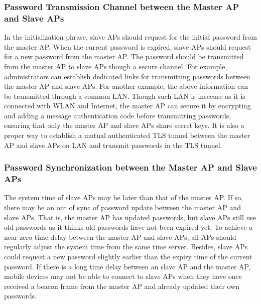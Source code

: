 \subsubsection{Password Transmission Channel between the Master AP and Slave APs} 
In the initialization phrase, slave APs should request for the initial password from the master AP. When the current password is expired, slave APs should request for a new password from the master AP. The password should be transmitted from the master AP to slave APs though a secure channel. For example, administrators can establish dedicated links for transmitting passwords between the master AP and slave APs. For another example, the above information can be transmitted through a common LAN. Though such LAN is insecure as it is connected with WLAN and Internet, the master AP can secure it by encrypting and adding a message authentication code before transmitting passwords, ensuring that only the master AP and slave APs share secret keys. It is also a proper way to establish a mutual authenticated TLS tunnel between the master AP and slave APs on LAN and transmit passwords in the TLS tunnel. 


\subsubsection{Password Synchronization between the Master AP and Slave APs}
The system time of slave APs may be later than that of the master AP. If so, there may be an out of sync of password update between the master AP and slave APs. That is, the master AP has updated passwords, but slave APs still use old passwords as it thinks old passwords have not been expired yet. To achieve a near-zero time delay between the master AP and slave APs, all APs should regularly adjust the system time from the same time server. Besides, slave APs could request a new password slightly earlier than the expiry time of the current password. If there is a long time delay between an slave AP and the master AP, mobile devices may not be able to connect to slave APs when they have once received a beacon frame from the master AP and already updated their own passwords. 



